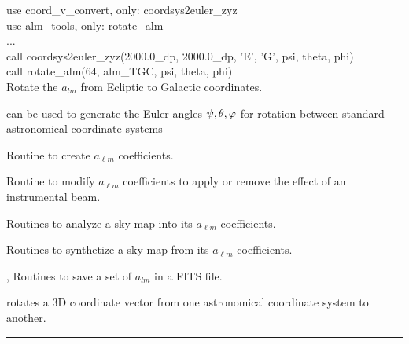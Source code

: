 \begin{example}
{
use coord\_v\_convert, only: coordsys2euler\_zyz \\
use alm\_tools, only: rotate\_alm \\
...\\
call coordsys2euler\_zyz(2000.0\_dp, 2000.0\_dp, 'E', 'G', psi, theta, phi) \\
call rotate\_alm(64, alm\_TGC, psi, theta, phi)  \\
}
{
Rotate the $a_{lm}$ from Ecliptic to Galactic coordinates.
}
\end{example}


\begin{related}
  \begin{sulist}{} %
  \item[\htmlref{coordsys2euler\_zyz}{sub:coordsys2euler_zyz}] can be used to generate
the Euler angles $\psi, \theta, \varphi $ for rotation between standard astronomical coordinate systems
  \item[\htmlref{create\_alm}{sub:create_alm}] Routine to create $a_{\ell m}$ coefficients.
  \item[\htmlref{alter\_alm}{sub:alter_alm}] Routine to modify $a_{\ell m}$
  coefficients to apply or remove the effect of an instrumental beam.
  \item[\htmlref{map2alm}{sub:map2alm}]  Routines to analyze a \healpix sky map into its $a_{\ell m}$
  coefficients.
  \item[\htmlref{alm2map}{sub:alm2map}] Routines to synthetize a \healpix sky map from its $a_{\ell m}$
  coefficients.
  \item[\htmlref{alms2fits}{sub:alms2fits}, \htmlref{dump\_alms}{sub:dump_alms}]
  Routines to save a set of $a_{lm}$ in a FITS file.  
  \item[\htmlref{xcc\_v\_convert}{sub:xcc_v_convert}] rotates a 3D coordinate
vector from one astronomical coordinate system to another.
  \end{sulist}
\end{related}

\rule{\hsize}{2mm}

\newpage
